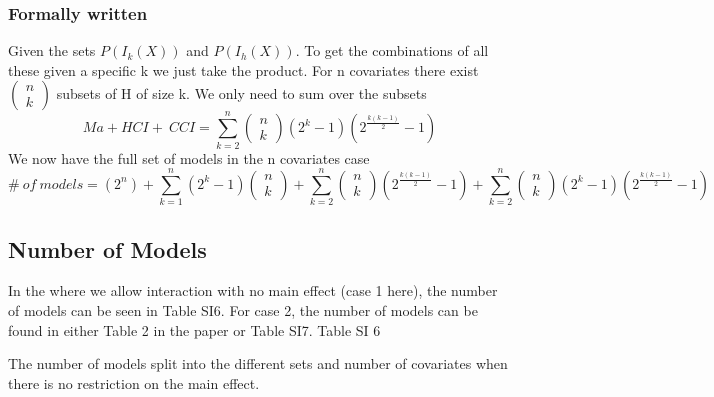 \subsubsection{Formally written}

Given the sets $P\left(I_k\left(X\right)\right)$ and $P\left(I_h\left(X\right)\right)$. To get the combinations of all these given a specific k we just take the product. For n covariates there exist $\left( \begin{array}{c}
n \\ 
k \end{array}
\right)$ subsets of H of size k. We only need to sum over the subsets
\[Ma+HCI+\ CCI=\sum^n_{k=2}{\left( \begin{array}{c}
n \\ 
k \end{array}
\right)\left(2^k-1\right)\left(2^{\frac{k\left(k-1\right)}{2}}-1\right)}\] 
We now have the full set of models in the n covariates case
\[\#\ of\ models=\left(2^n\right)+\sum^n_{k=1}{\left(2^k-1\right)\left( \begin{array}{c}
n \\ 
k \end{array}
\right)}+\sum^n_{k=2}{\left( \begin{array}{c}
n \\ 
k \end{array}
\right)\left(2^{\frac{k\left(k-1\right)}{2}}-1\right)}+\sum^n_{k=2}{\left( \begin{array}{c}
n \\ 
k \end{array}
\right)\left(2^k-1\right)\left(2^{\frac{k\left(k-1\right)}{2}}-1\right)}\] 
\subsection{Number of Models}

\noindent In the where we allow interaction with no main effect (case 1 here), the number of models can be seen in Table SI6. For case 2, the number of models can be found in either Table 2 in the paper or Table SI7. Table SI 6





\noindent The number of models split into the different sets and number of covariates when there is no restriction on the main effect.





